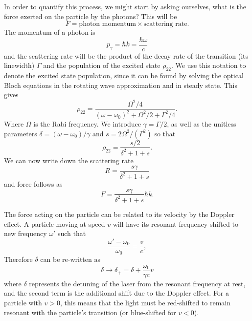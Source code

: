 In order to quantify this process, we might start by asking ourselves, what is
the force exerted on the particle by the photons? This will be
%
\begin{equation}
  F = \text{photon momentum} \times \text{scattering rate}.
\end{equation}
%
The momentum of a photon is
%
\begin{equation}
  p_\gamma = \hbar k = \frac{\hbar\omega}{c}
\end{equation}
%
and the scattering rate will be the product of the decay rate of the transition
(its linewidth) $\Gamma$ and the population of the excited state $\rho_{22}$.
We use this notation to denote the excited state population, since it can be
found by solving the optical Bloch equations in the rotating wave approximation
and in steady state. This gives~\cite{Metcalf1999}
%
\begin{equation}
\rho_{22} = \frac{\Omega^2/4}{(\omega-\omega_0)^2 + \Omega^2/2 + \Gamma^2/4}.
\end{equation}
%
Where $\Omega$ is the Rabi frequency. We introduce $\gamma=\Gamma/2$, as well
as the unitless parameters $\delta = (\omega - \omega_0)/\gamma$ and
$s=2\Omega^2/(\Gamma^2)$ so that
%
\begin{equation}
  \rho_{22} = \frac{s/2}{\delta^2 + 1 + s}.
\end{equation}
%
We can now write down the scattering rate
%
\begin{equation}
  R = \frac{s\gamma}{\delta^2 + 1 + s}
\end{equation}
%
and force follows as
%
\begin{equation}
  F = \frac{s\gamma}{\delta^2 + 1 + s}\hbar k.
\end{equation}

The force acting on the particle can be related to its velocity by the Doppler
effect. A particle moving at speed $v$ will have its resonant frequency shifted
to new frequency $\omega'$ such that
%
\begin{equation}
  \frac{\omega'-\omega_0}{\omega_0} = \frac{v}{c},
\end{equation}
%
Therefore $\delta$ can be re-written as
%
\begin{equation}
  \delta \rightarrow \delta_+ = \delta + \frac{\omega_0}{\gamma c}v
\end{equation}
%
where $\delta$ represents the detuning of the laser from the resonant frequency
at rest, and the second term is the additional shift due to the Doppler effect.
For a particle with $v>0$, this means that the light must be red-shifted to
remain resonant with the particle's transition (or blue-shifted for $v<0$).

